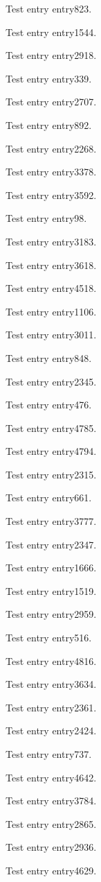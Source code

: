 Test entry \gls{entry823}.

Test entry \gls{entry1544}.

Test entry \gls{entry2918}.

Test entry \gls{entry339}.

Test entry \gls{entry2707}.

Test entry \gls{entry892}.

Test entry \gls{entry2268}.

Test entry \gls{entry3378}.

Test entry \gls{entry3592}.

Test entry \gls{entry98}.

Test entry \gls{entry3183}.

Test entry \gls{entry3618}.

Test entry \gls{entry4518}.

Test entry \gls{entry1106}.

Test entry \gls{entry3011}.

Test entry \gls{entry848}.

Test entry \gls{entry2345}.

Test entry \gls{entry476}.

Test entry \gls{entry4785}.

Test entry \gls{entry4794}.

Test entry \gls{entry2315}.

Test entry \gls{entry661}.

Test entry \gls{entry3777}.

Test entry \gls{entry2347}.

Test entry \gls{entry1666}.

Test entry \gls{entry1519}.

Test entry \gls{entry2959}.

Test entry \gls{entry516}.

Test entry \gls{entry4816}.

Test entry \gls{entry3634}.

Test entry \gls{entry2361}.

Test entry \gls{entry2424}.

Test entry \gls{entry737}.

Test entry \gls{entry4642}.

Test entry \gls{entry3784}.

Test entry \gls{entry2865}.

Test entry \gls{entry2936}.

Test entry \gls{entry4629}.

